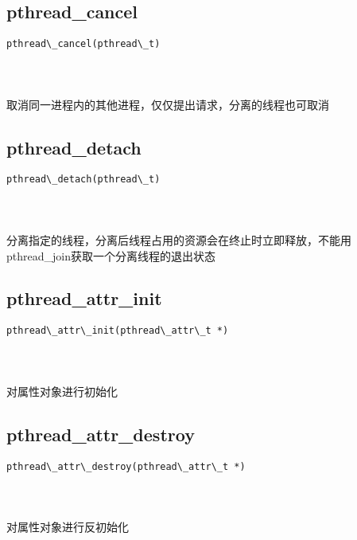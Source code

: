\documentclass[10pt,a4paper]{article}
\begin{document}
\subsection{pthread\_cancel}
\begin{spacing}{2.0}
\lstset{language=C,numbers=none}
\begin{lstlisting}
pthread\_cancel(pthread\_t)
\end{lstlisting}
{\large\color[rgb]{0.2,0.4,0.6}{pthread\_t:}}
\paragraph{ \ \ }取消同一进程内的其他进程，仅仅提出请求，分离的线程也可取消
\end{spacing}

\subsection{pthread\_detach}
\begin{spacing}{2.0}
\lstset{language=C,numbers=none}
\begin{lstlisting}
pthread\_detach(pthread\_t)
\end{lstlisting}
{\large\color[rgb]{0.2,0.4,0.6}{pthread\_t:}}
\paragraph{ \ \ }分离指定的线程，分离后线程占用的资源会在终止时立即释放，不能用pthread\_join获取一个分离线程的退出状态
\end{spacing}

\subsection{pthread\_attr\_init}
\begin{spacing}{2.0}
\lstset{language=C,numbers=none}
\begin{lstlisting}
pthread\_attr\_init(pthread\_attr\_t *)
\end{lstlisting}
{\large\color[rgb]{0.2,0.4,0.6}{*:}}
\paragraph{ \ \ }对属性对象进行初始化
\end{spacing}

\subsection{pthread\_attr\_destroy}
\begin{spacing}{2.0}
\lstset{language=C,numbers=none}
\begin{lstlisting}
pthread\_attr\_destroy(pthread\_attr\_t *)
\end{lstlisting}
{\large\color[rgb]{0.2,0.4,0.6}{*:}}
\paragraph{ \ \ }对属性对象进行反初始化
\end{spacing}
\end{document}
